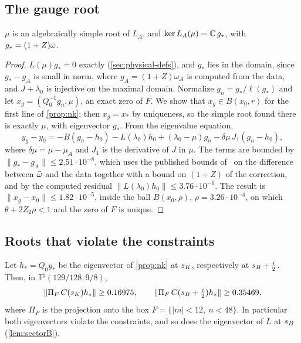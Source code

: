 \subsection{The gauge root}\label{sec:roots-gauge}

\begin{proposition}\label{prop:mu}
$\mu$ is an algebraically simple root of $L_A$, and $\ker L_A(\mu)=\mathbb{C}\,g_*$, with $g_*=(1+Z)\bar\omega$.
\end{proposition}

\begin{proof}
$L(\mu)g_*=0$ exactly (\cref{sec:physical-defs}), and $g_*$ lies in the domain, since $g_*-g_A$ is small in norm,
where $g_A=(1+Z)\omega_A$ is computed from the data, and $J+\lambda_0$ is injective on the maximal domain. Normalize
$g_n=g_*/\ell(g_*)$ and let $x_g=(Q_0^{-1}g_n,\mu)$, an exact zero of $F$. We show that $x_g\in B(x_0,r)$ for the first
line of \cref{prop:nk}; then $x_g=x_*$ by uniqueness, so the simple root found there is exactly $\mu$, with
eigenvector $g_*$. From the eigenvalue equation,
\[
  y_g-y_0=-B(g_n-h_0)-L(\lambda_0)h_0+(\lambda_0-\mu)g_n-\delta\mu\,J_1(g_n-h_0),
\]
where $\delta\mu=\mu-\mu_A$ and $J_1$ is the derivative of $J$ in $\mu$. The terms are bounded by
$\|g_*-g_A\|\le2.51\cdot10^{-8}$, which uses the published bounds of~\cite{RT2019} on the difference between
$\bar\omega$ and the data together with a bound on $(1+Z)$ of the correction, and by the computed residual
$\|L(\lambda_0)h_0\|\le3.76\cdot10^{-6}$. The result is $\|x_g-x_0\|\le1.82\cdot10^{-5}$, inside the ball $B(x_0,\rho)$, $\rho=3.26\cdot10^{-4}$, on which
$\theta+2Z_2\rho<1$ and the zero of $F$ is unique.
\end{proof}

\subsection{Roots that violate the constraints}\label{sec:roots-witness}

\begin{proposition}\label{prop:witness}
Let $h_*=Q_0y_*$ be the eigenvector of \cref{prop:nk} at $s_{K}$, respectively at $s_{B}+\tfrac i2$. Then, in
$\mathbb T^\sharp(129/128,9/8)$,
\[
  \|\Pi_F\,C(s_{K})h_*\|\ge0.16975,\qquad \|\Pi_F\,C(s_{B}+\tfrac i2)h_*\|\ge0.35469,
\]
where $\Pi_F$ is the projection onto the box $F=\{|m|<12,\ n<48\}$. In particular both eigenvectors violate the
constraints, and so does the eigenvector of $L$ at $s_{B}$ (\cref{lem:sectorB}).
\end{proposition}

